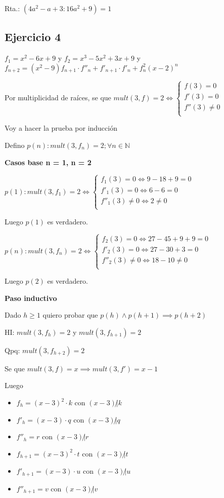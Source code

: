 Rta.: $ (4a^2-a+3:16a^2+9) = 1 $

\subsection{Ejercicio 4}

$ f_1 = x^2 - 6x + 9 $ y $ f_2 = x^3 - 5x^2 + 3x + 9 $ y $ f_{n+2} = (x^2 - 9)f_{n+1} \cdot f''_n + f'_{n+1} \cdot f'_n + f^2_n(x-2)^n $

Por multiplicidad de raíces, se que $ mult(3,f) = 2 \iff \begin{cases}
    f(3) = 0 \\
    f'(3) = 0 \\
    f''(3) \neq 0 \\
\end{cases} $

Voy a hacer la prueba por inducción

Defino $ p(n): mult(3,f_n) = 2; \forall n \in \mathbb{N} $

\textbf{Casos base n = 1, n = 2}

$ p(1): mult(3,f_1) = 2 \iff \begin{cases}
    f_1(3) = 0 \iff 9-18+9 = 0 \\
    f'_1(3) = 0 \iff 6 - 6 = 0\\
    f''_1(3) \neq 0 \iff 2 \neq 0\\
\end{cases} $

Luego $ p(1) $ es verdadero.

$ p(n): mult(3,f_n) = 2 \iff \begin{cases}
    f_2(3) = 0 \iff 27-45+9+9 = 0 \\
    f'_2(3) = 0 \iff 27-30+3 = 0\\
    f''_2(3) \neq 0 \iff 18-10 \neq 0\\
\end{cases} $

Luego $ p(2) $ es verdadero.

\textbf{Paso inductivo}

Dado $ h \geq 1 $ quiero probar que $ p(h) \wedge p(h+1) \implies p(h+2) $

HI: $ mult(3, f_h) = 2 $ y $ mult (3, f_{h+1}) = 2 $

Qpq: $ mult(3, f_{h+2}) = 2 $

Se que $ mult(3,f) = x \implies mult(3, f') = x-1 $

Luego
\begin{itemize}
    \item $ f_h = (x-3)^2 \cdot k $ con $ (x-3) \not | k $
    \item $ f'_h = (x-3) \cdot q $ con $ (x-3) \not | q $
    \item $ f''_h = r $ con $ (x-3) \not | r $
    \item $ f_{h+1} = (x-3)^2 \cdot t $ con $ (x-3) \not | t $
    \item $ f'_{h+1} = (x-3) \cdot u $ con $ (x-3) \not | u $
    \item $ f''_{h+1} = v $ con $ (x-3) \not | v $
\end{itemize}

